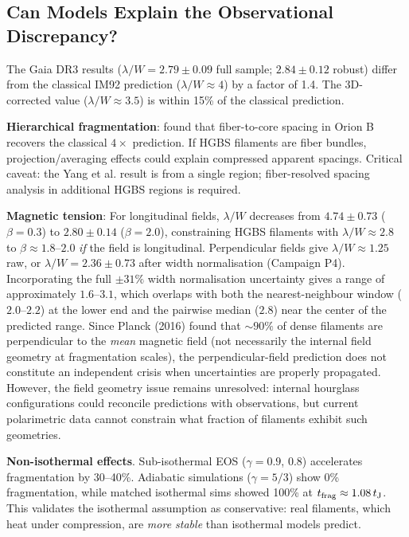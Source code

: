 \documentclass[twocolumn,usenatbib]{mnras}
\begin{document}
\subsection{Can Models Explain the Observational Discrepancy?}

The Gaia DR3 results ($\lambda/W = 2.79 \pm 0.09$ full sample; $2.84 \pm 0.12$ robust) differ from the classical IM92 prediction ($\lambda/W \approx 4$) by a factor of 1.4. The 3D-corrected value ($\lambda/W \approx 3.5$) is within 15\% of the classical prediction.

\textbf{Hierarchical fragmentation}: \citet{Yang2024} found that fiber-to-core spacing in Orion B recovers the classical $4\times$ prediction. If HGBS filaments are fiber bundles, projection/averaging effects could explain compressed apparent spacings. Critical caveat: the Yang et al. result is from a single region; fiber-resolved spacing analysis in additional HGBS regions is required.

\textbf{Magnetic tension}: For longitudinal fields, $\lambda/W$ decreases from $4.74 \pm 0.73$ ($\beta = 0.3$) to $2.80 \pm 0.14$ ($\beta = 2.0$), constraining HGBS filaments with $\lambda/W \approx 2.8$ to $\beta \approx 1.8$--$2.0$ \textit{if} the field is longitudinal. Perpendicular fields give $\lambda/W \approx 1.25$ raw, or $\lambda/W = 2.36 \pm 0.73$ after width normalisation (Campaign P4). Incorporating the full $\pm 31\%$ width normalisation uncertainty gives a range of approximately $1.6$--$3.1$, which overlaps with both the nearest-neighbour window ($2.0$--$2.2$) at the lower end and the pairwise median ($2.8$) near the center of the predicted range. Since Planck (2016) found that $\sim 90\%$ of dense filaments are perpendicular to the \textit{mean} magnetic field (not necessarily the internal field geometry at fragmentation scales), the perpendicular-field prediction does not constitute an independent crisis when uncertainties are properly propagated. However, the field geometry issue remains unresolved: internal hourglass configurations could reconcile predictions with observations, but current polarimetric data cannot constrain what fraction of filaments exhibit such geometries.

\textbf{Non-isothermal effects}. Sub-isothermal EOS ($\gamma = 0.9$, $0.8$) accelerates fragmentation by 30--40\%. Adiabatic simulations ($\gamma = 5/3$) show 0\% fragmentation, while matched isothermal sims showed 100\% at $t_{\rm frag} \approx 1.08\,t_{\rm J}$. This validates the isothermal assumption as conservative: real filaments, which heat under compression, are {\it more stable} than isothermal models predict.
\end{document}
